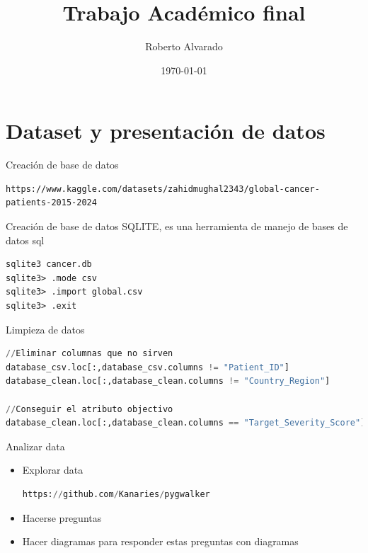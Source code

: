 \documentclass{beamer}
\title{Trabajo Académico final}
\date{\today}
\author{Roberto Alvarado}
\institute{UTPL}
\begin{document}
  \maketitle
  \section{Dataset y presentación de datos}
  \begin{frame}[fragile]{Creación de base de datos}
      \tiny
\begin{lstlisting}
https://www.kaggle.com/datasets/zahidmughal2343/global-cancer-patients-2015-2024
\end{lstlisting}
    \end{frame}
  \begin{frame}[fragile]{Creación de base de datos}
      SQLITE, es una herramienta de manejo de bases de datos sql
\begin{lstlisting}
sqlite3 cancer.db
sqlite3> .mode csv
sqlite3> .import global.csv
sqlite3> .exit
\end{lstlisting}
    \end{frame}
    \begin{frame}[fragile]{Limpieza de datos}
        \scriptsize
    \begin{lstlisting}[language=Python]
//Eliminar columnas que no sirven
database_csv.loc[:,database_csv.columns != "Patient_ID"]
database_clean.loc[:,database_clean.columns != "Country_Region"]

//Conseguir el atributo objectivo
database_clean.loc[:,database_clean.columns == "Target_Severity_Score"]
    \end{lstlisting}
    \end{frame}
    \begin{frame}[fragile]{Analizar data}
        \scriptsize
    \begin{itemize}
        \item Explorar data
            \begin{lstlisting}[language=Python]
https://github.com/Kanaries/pygwalker
            \end{lstlisting}
        \item Hacerse preguntas
        \item Hacer diagramas para responder estas preguntas con diagramas
    \end{itemize}
    \end{frame}
\end{document}
